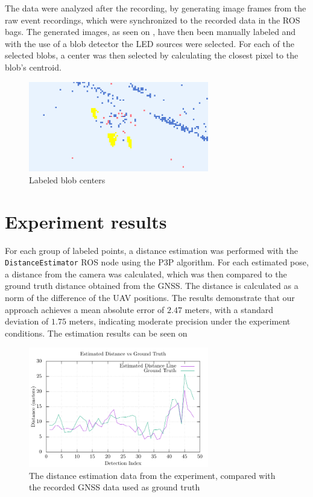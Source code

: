 The data were analyzed after the recording, by generating image frames from the raw event recordings, which
were synchronized to the recorded data in the ROS bags.
The generated images, as seen on , have then been manually labeled and with the use of a blob detector
the \ac{LED} sources
were selected. For each of the selected blobs, a center was then selected by calculating the closest pixel to the
blob's centroid.

\begin{figure}[H]
	\centering
	\includegraphics[width=0.7\textwidth]{./fig/photos/labeled_2.png}
	\caption{Labeled blob centers}
	\label{fig:labeled}
\end{figure}

\section{Experiment results}

For each group of labeled points, a distance estimation was performed with the \texttt{DistanceEstimator} ROS node using the
\ac{P3P} algorithm. For each estimated pose, a distance from the camera was calculated, which was then compared to the
ground truth distance obtained from the \ac{GNSS}. The distance is calculated as a norm of the difference of the \ac{UAV} positions.
The results demonstrate that our approach achieves a mean absolute error of $2.47$ meters, with a standard deviation of $1.75$ meters,
indicating moderate precision under the experiment conditions.
The estimation
results can be seen on 

\begin{figure}[H]
	\centering
	\includegraphics[width=0.7\textwidth]{./fig/tikz/experiment_analysis.pdf}
	\caption{The distance estimation data from the experiment, compared with the recorded GNSS data used as ground truth}
	\label{fig:experiment_results}
\end{figure}

